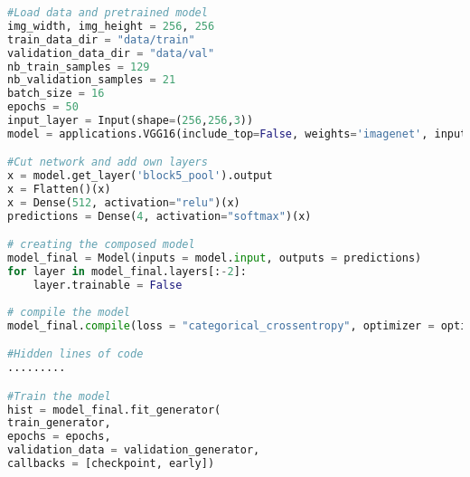 \begin{appendices}
\begin{lstlisting}[language=python]
#Load data and pretrained model
img_width, img_height = 256, 256
train_data_dir = "data/train"
validation_data_dir = "data/val"
nb_train_samples = 129
nb_validation_samples = 21
batch_size = 16
epochs = 50
input_layer = Input(shape=(256,256,3))
model = applications.VGG16(include_top=False, weights='imagenet', input_tensor=input_layer, pooling=None)

#Cut network and add own layers
x = model.get_layer('block5_pool').output
x = Flatten()(x)
x = Dense(512, activation="relu")(x)
predictions = Dense(4, activation="softmax")(x)

# creating the composed model
model_final = Model(inputs = model.input, outputs = predictions)
for layer in model_final.layers[:-2]:
    layer.trainable = False
    
# compile the model
model_final.compile(loss = "categorical_crossentropy", optimizer = optimizers.SGD(lr = 0.0001, momentum = 0.9), metrics=["accuracy"])

#Hidden lines of code
.........

#Train the model
hist = model_final.fit_generator(
train_generator,
epochs = epochs,
validation_data = validation_generator,
callbacks = [checkpoint, early])
\end{lstlisting}

\end{appendices}
